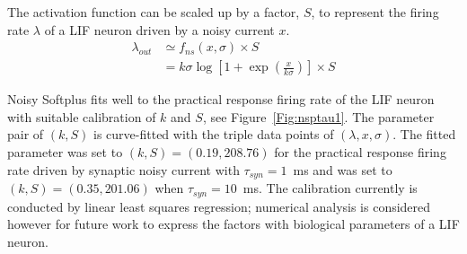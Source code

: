 \documentclass[runningheads,a4paper]{llncs}
\begin{document}
The activation function can be scaled up by a factor, $S$, to represent the firing rate $\lambda$ of a LIF neuron driven by a noisy current $x$.
\begin{equation}
\begin{aligned}
\lambda_{out} &\simeq f_{ns}(x, \sigma) \times S\\
&=k \sigma \log [1 + \exp(\frac{x}{k \sigma})] \times S
\end{aligned}
\label{equ:fit}
\end{equation}	

Noisy Softplus fits well to the practical response firing rate of the LIF neuron with suitable calibration of $k$ and $S$, see Figure~\ref{Fig:nsptau1}.
The parameter pair of $(k, S)$ is curve-fitted with the triple data points of $(\lambda, x, \sigma)$.
The fitted parameter was set to $(k, S)=(0.19,208.76)$ for the practical response firing rate driven by synaptic noisy current with $\tau_{syn}=1$~ms and was set to $(k, S)=(0.35,201.06)$ when $\tau_{syn}=10$~ms.
The calibration currently is conducted by linear least squares regression; numerical analysis is considered however for future work to express the factors with biological parameters of a LIF neuron.
\end{document}
